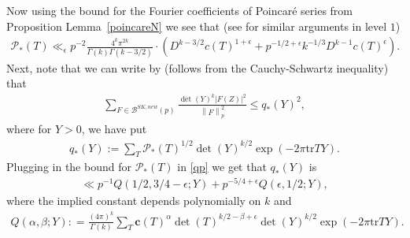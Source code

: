 \documentclass[11pt]{amsart}
\numberwithin{equation}{section}
\theoremstyle{plain}
\theoremstyle{definition}
\newcommand{\lemref}[1]{Lemma~\ref{#1}}
\newcommand{\mf}{\mathbf}
\newcommand{\mc}{\mathcal}
\newcommand{\tr}{\mathrm{tr}}
\newcommand*{\norm}[1]{\left\lVert#1\right\rVert}
\newcommand{\sumn}{\sum \nolimits}
\begin{document}
Now using the bound for the Fourier coefficients of Poincar{\'e} series from Proposition \lemref{poincareN} we see that (see \cite{PASD} for similar arguments in level $1$)
\begin{align} 
\mathcal P_*(T) \ll_\epsilon p^{-2} \frac{ 4^k \pi^{2k} }{\Gamma(k) \Gamma(k-3/2) } 
 \cdot \left(  D^{k-3/2} c(T)^{1+\epsilon} + p^{-1/2 +\epsilon} k^{-1/3} D^{k-1}   c(T)^{\epsilon} \right). \label{p*t}
\end{align}
Next, note that we can write by \cite[Lem.~4.4]{sd-hk} (follows from the Cauchy-Schwartz inequality) that
\begin{align} \label{lem41}
     \sumn_{F \in \mc B^{SK, new}(p) }  \frac{\det(Y)^k |F(Z)|^2}{\norm{F}^2_p} \le q_*(Y)^2,
     \end{align}
where for $Y>0$, we have put
\begin{align} \label{qp}
   q_{*}(Y) := \sumn_T \mathcal P_*(T)^{1/2} \det(Y)^{k/2} \exp(-2 \pi \tr TY).
\end{align}
Plugging in the bound for $\mathcal P_*(T)$ in \eqref{qp} we get that $ q_*(Y) $ is
\begin{align}
\ll p^{-1}Q(1/2,3/4-\epsilon;Y)+ p^{-5/4+\epsilon} Q(\epsilon, 1/2; Y), \label{twoQ}
\end{align}
where the implied constant depends polynomially on $k$ and
\begin{align}\label{QabY}
    Q(\alpha, \beta; Y): = \frac{ (4\pi)^k}{ \Gamma(k) } \sumn_T \mf c(T)^\alpha  \det(T)^{k/2-\beta +\epsilon} \det(Y)^{k/2} \exp(-2 \pi \tr TY) .
\end{align}
\end{document}
